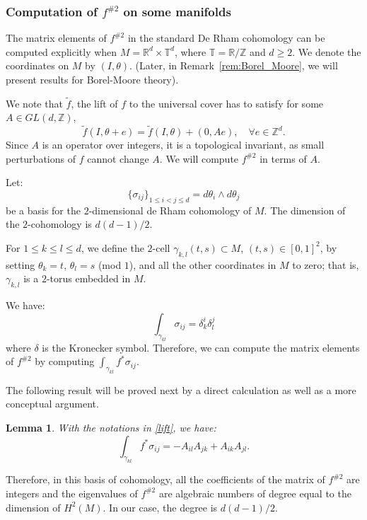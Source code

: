 \documentclass[11pt]{amsart}
\newtheorem{lem}[thm]{Lemma}
\theoremstyle{definition}
\theoremstyle{remark}
\numberwithin{equation}{section}
\newcommand{\R}{\mathbb R}
\newcommand{\T}{\mathbb T}
\newcommand{\Z}{\mathbb Z}
\begin{document}
\subsubsection{Computation of $f^{\#2}$ on some manifolds}
The matrix elements of $f^{\#2}$ in the standard De Rham cohomology
can be computed explicitly
when $M = \R^d \times \T^d$, where $\T=\R/\Z$ and $d\ge 2$.  We denote the coordinates
on $M$
by $(I,\theta)$. (Later, in  Remark~\ref{rem:Borel_Moore},
we will present results for Borel-Moore  theory).



We note that $\tilde f$, the lift of $f$ to
the universal cover has to satisfy for some $A \in GL(d, \Z)$,
\begin{equation}
\label{lift}
\tilde f(I,\theta + e ) =
\tilde f(I, \theta) + (0, A e), \quad \forall e \in \Z^d .
\end{equation}
Since $A$ is an operator over integers, it is a topological invariant, as small perturbations of $f$ cannot change $A$.  We will
compute $f^{\#2}$ in terms of $A$.

Let:
\[
\{ \sigma_{ij}\}_{1\le i < j \le d}= d \theta_i \wedge d \theta_j
\]
be a basis for the $2$-dimensional de Rham cohomology of $M$. The dimension of the $2$-cohomology
is $d(d-1)/2$.

For $1 \le k \le l \le d$,  we define the $2$-cell
$\gamma_{k,l}(t,s) \subset M$, $(t,s) \in [0,1]^2$,
 by setting $\theta_k = t$, $\theta_l= s$ (mod $1$),
and all the other coordinates in $M$ to zero; that is,
$\gamma_{k,l}$ is a $2$-torus embedded in $M$.

We have:
\[
\int_{\gamma_{kl}}\sigma_{ij} = \delta^i_k \delta^j_l
\]
where $\delta$ is the Kronecker symbol.
Therefore,  we can compute the matrix
elements of $f^{\#2}$ by computing
$\int_{\gamma_{kl}}f^*\sigma_{ij} $.

The following result will be proved next by a direct calculation
as well as a more conceptual argument.


\begin{lem}
  \label{prop:coefficients}
  With the notations in \eqref{lift}, we have:
  \begin{equation}
    \label{coefficients}
    \int_{\gamma_{kl}}f^*\sigma_{ij} = -A_{il} A_{jk} + A_{ik}A_{jl} .
  \end{equation}
\end{lem}
Therefore, in this basis of cohomology, all the coefficients
of the matrix of $f^{\#2}$ are integers and the eigenvalues of $f^{\#2}$
are algebraic numbers of degree equal to the dimension of
$H^2(M)$. In our case, the degree is  $d(d-1)/2$.
\end{document}
